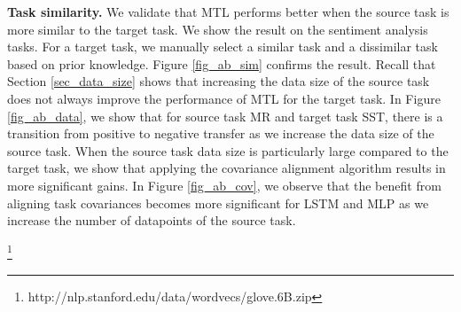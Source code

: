 \textbf{Task similarity.} We validate that MTL performs better when the source task is more similar to the target task.
We show the result on the sentiment analysis tasks.
For a target task, we manually select a similar task and a dissimilar task based on prior knowledge.
Figure \ref{fig_ab_sim} confirms the result.
Recall that Section \ref{sec_data_size} shows that increasing the data size of the source task does not always improve the performance of MTL for the target task.
In Figure \ref{fig_ab_data}, we show that for source task MR and target task SST, there is a transition from positive to negative transfer as we increase the data size of the source task.
When the source task data size is particularly large compared to the target task, we show that applying the covariance alignment algorithm results in more significant gains.
In Figure \ref{fig_ab_cov}, we observe that the benefit from aligning task covariances becomes more significant for LSTM and MLP as we increase the number of datapoints of the source task.

\footnote{http://nlp.stanford.edu/data/wordvecs/glove.6B.zip}
